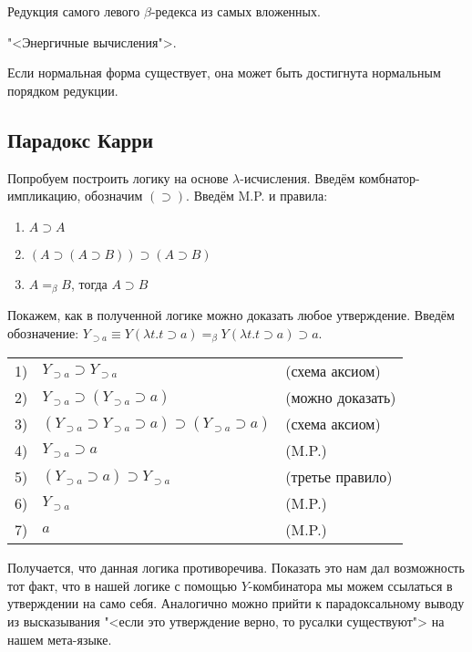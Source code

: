 \begin{definition}
    Редукция самого левого $\beta$-редекса из самых вложенных.
\end{definition}
"<Энергичные вычисления">.

\begin{statement}
    Если нормальная форма существует, она может быть достигнута нормальным порядком редукции.
\end{statement}

\subsection{\texorpdfstring{Парадокс Карри}{Curry's paradox}}

Попробуем построить логику на основе $\lambda$-исчисления.
Введём комбнатор-импликацию, обозначим $(\supset)$. Введём M.P. и правила:
\begin{enumerate}
    \item $A \supset A$
    \item $(A \supset (A \supset B)) \supset (A \supset B)$
    \item $A =_{\beta} B$, тогда $A \supset B$
\end{enumerate}

Покажем, как в полученной логике можно доказать любое утверждение.
Введём обозначение: $Y_{\supset a} \equiv Y (\lambda t . t \supset a) =_{\beta} Y (\lambda t . t \supset a) \supset a$.

\begin{tabular}{lll}
    1) & $Y_{\supset a} \supset Y_{\supset a}$ & (схема аксиом) \\
    2) & $Y_{\supset a} \supset (Y_{\supset a} \supset a)$ & (можно доказать) \\
    3) & $(Y_{\supset a} \supset Y_{\supset a} \supset a) \supset (Y_{\supset a} \supset a)$ & (схема аксиом) \\
    4) & $Y_{\supset a} \supset a$ & (M.P.) \\
    5) & $(Y_{\supset a} \supset a) \supset Y_{\supset a}$ & (третье правило) \\
    6) & $Y_{\supset a}$ & (M.P.) \\
    7) & $a$ & (M.P.)
\end{tabular}

Получается, что данная логика противоречива. Показать это нам дал возможность тот факт,
что в нашей логике с помощью $Y$-комбинатора мы можем ссылаться в утверждении на само себя.
Аналогично можно прийти к парадоксальному выводу из высказывания "<если это утверждение верно, то русалки существуют"> на нашем мета-языке.

